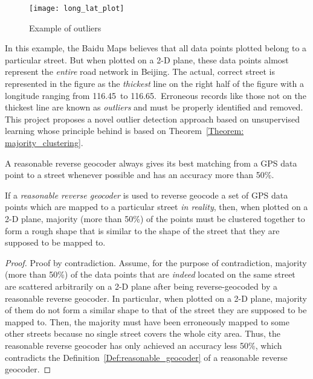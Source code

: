 \begin{figure}[h]
\texttt{[image: long\_lat\_plot]}
\centering
\caption{Example of outliers}\label{Fig:exmp_outlier}
\end{figure}

In this example, the Baidu Maps believes that all data points plotted belong to a particular street. But when plotted on a 2-D plane, these data points almost represent the \emph{entire} road network in Beijing. The actual, correct street is represented in the figure as the \emph{thickest} line on the right half of the figure with a longitude ranging from 116.45\textdegree~to 116.65\textdegree.~Erroneous records like those not on the thickest line are known as \emph{outliers} and must be properly identified and removed. This project proposes a novel outlier detection approach based on unsupervised learning whose principle behind is based on Theorem~\ref{Theorem: majority_clustering}.

\begin{defn}\label{Def:reasonable_geocoder}
A reasonable reverse geocoder always gives its best matching from a GPS data point to a street whenever possible and has an accuracy more than 50\%.
\end{defn}

\begin{theorem}\label{Theorem: majority_clustering}
If a \emph{reasonable reverse geocoder} is used to reverse geocode a set of GPS data points which are mapped to a particular street \emph{in reality}, then, when plotted on a 2-D plane, majority (more than 50\%) of the points must be clustered together to form a rough shape that is similar to the shape of the street that they are supposed to be mapped to. 
\end{theorem}

\begin{proof}
Proof by contradiction. Assume, for the purpose of contradiction, majority (more than 50\%) of the data points that are \emph{indeed} located on the same street are scattered arbitrarily on a 2-D plane after being reverse-geocoded by a reasonable reverse geocoder. In particular, when plotted on a 2-D plane, majority of them do not form a similar shape to that of the street they are supposed to be mapped to. Then, the majority must have been erroneously mapped to some other streets because no single street covers the whole city area. Thus, the reasonable reverse geocoder has only achieved an accuracy less 50\%, which contradicts the Definition~\ref{Def:reasonable_geocoder} of a reasonable reverse geocoder. 
\end{proof}

